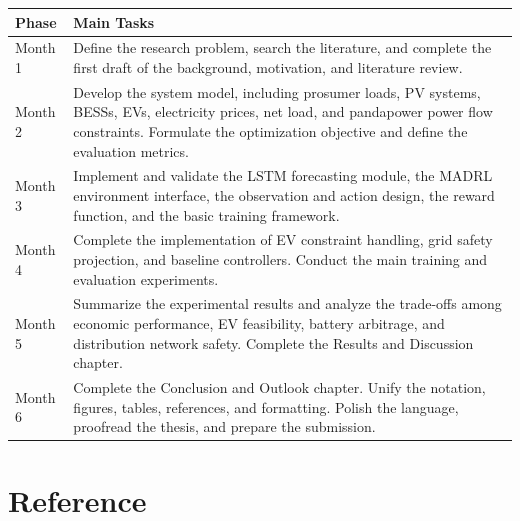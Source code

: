 \documentclass[12pt,a4paper]{ctexart}
\begin{document}
\begin{center}
\begin{tabular}{p{}p{}}
\toprule
Phase & Main Tasks \\
\midrule
Month 1 & Define the research problem, search the literature, and complete the first draft of the background, motivation, and literature review. \\
Month 2 & Develop the system model, including prosumer loads, PV systems, BESSs, EVs, electricity prices, net load, and pandapower power flow constraints. Formulate the optimization objective and define the evaluation metrics. \\
Month 3 & Implement and validate the LSTM forecasting module, the MADRL environment interface, the observation and action design, the reward function, and the basic training framework. \\
Month 4 & Complete the implementation of EV constraint handling, grid safety projection, and baseline controllers. Conduct the main training and evaluation experiments. \\
Month 5 & Summarize the experimental results and analyze the trade-offs among economic performance, EV feasibility, battery arbitrage, and distribution network safety. Complete the Results and Discussion chapter. \\
Month 6 & Complete the Conclusion and Outlook chapter. Unify the notation, figures, tables, references, and formatting. Polish the language, proofread the thesis, and prepare the submission. \\
\bottomrule
\end{tabular}
\end{center}

\clearpage
\section*{Reference}
\end{document}
